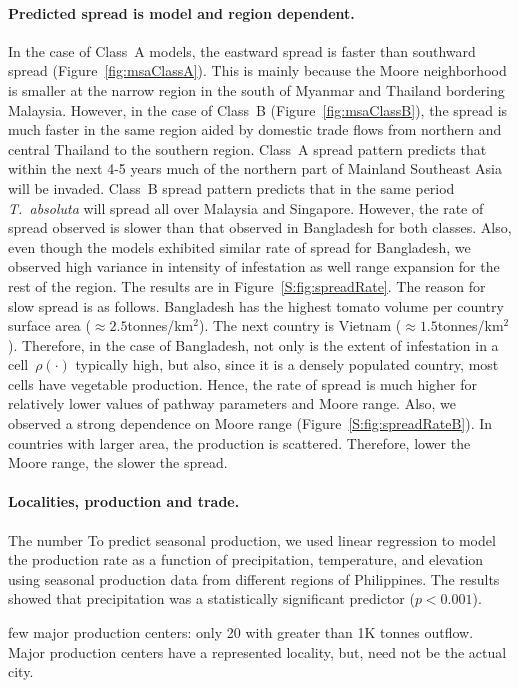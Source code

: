 \documentclass[11pt]{article}
\newcommand{\tuta}{\emph{T.~absoluta}}
\newcommand{\infest}{\rho}
\theoremstyle{definition}
\begin{document}
\paragraph{Predicted spread is model and region dependent.} In the case of Class~A
models, the eastward spread is faster than southward spread
(Figure~\ref{fig:msaClassA}). This is mainly because the Moore neighborhood
is smaller at the narrow region in the south of Myanmar and Thailand
bordering Malaysia.  However, in the case of Class~B
(Figure~\ref{fig:msaClassB}), the spread is much faster in the same region
aided by domestic trade flows from northern and central Thailand to the
southern region.  Class~A spread pattern predicts that within the next 4-5
years much of the northern part of Mainland Southeast Asia will be invaded.
Class~B spread pattern predicts that in the same period \tuta{} will spread
all over Malaysia and Singapore.  However, the rate of spread observed is
slower than that observed in Bangladesh for both classes. Also, even though
the models exhibited similar rate of spread for Bangladesh, we observed
high variance in intensity of infestation as well range expansion for the
rest of the region. The results are in Figure~\ref{S:fig:spreadRate}. The
reason for slow spread is as follows.  Bangladesh has the highest tomato
volume per country surface area ($\approx2.5$tonnes/km$^2$).  The next
country is Vietnam ($\approx1.5$tonnes/km$^2$). Therefore, in the case of
Bangladesh, not only is the extent of infestation in a
cell~$\infest(\cdot)$ typically high, but also, since it is a densely
populated country, most cells have vegetable production. Hence, the rate of
spread is much higher for relatively lower values of pathway parameters and
Moore range. Also, we observed a strong dependence on Moore range
(Figure~\ref{S:fig:spreadRateB}).  In countries with larger area, the
production is scattered. Therefore, lower the Moore range, the slower the
spread.

\paragraph{Localities, production and trade.}
The number
To predict seasonal production, we used linear regression to model the
production rate as a function of precipitation, temperature, and elevation
using seasonal production data from different regions of Philippines. The
results showed that precipitation was a statistically significant predictor
($p<0.001$).

few major production centers: only 20 with greater than 1K tonnes outflow.
Major production centers have a represented locality, but, need not be the
actual city.
\end{document}
